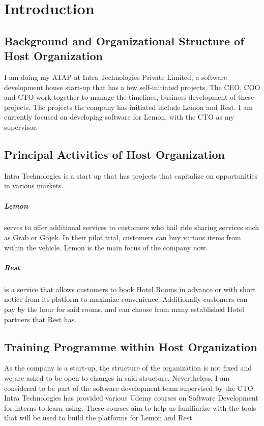 \section{Introduction}
\subsection{Background and Organizational Structure of Host Organization}
\noindent
I am doing my ATAP at Intra Technologies Private Limited, a software development house start-up that has a few self-initiated projects.
The CEO, COO and CTO work together to manage the timelines, business development of these projects.
The projects the company has initiated include Lemon and Rest. I am currently focused on developing software for Lemon, with the CTO as my supervisor. 

\subsection{Principal Activities of Host Organization}
\noindent
Intra Technologies is a start up that has projects that capitalize on opportunities in various markets.

\subparagraph{Lemon}
serves to offer additional services to customers who hail ride sharing services such as Grab or Gojek. In their
pilot trial, customers can buy various items from within the vehicle. Lemon is the main focus of the company now.

\subparagraph{Rest}
is a service that allows customers to book Hotel Rooms in advance or with short notice from its platform to 
maximize convenience. Additionally customers can pay by the hour for said rooms, and can choose from 
many established Hotel partners that Rest has.

\subsection{Training Programme within Host Organization}
\noindent
As the company is a start-up, the structure of the organization is not fixed and we are asked to be open to changes in said structure. 
Nevertheless, I am considered to be part of the software development team supervised by the CTO.
Intra Technologies has provided various Udemy courses\cite{REF1:1} on Software Development for interns to learn using.
These courses aim to help us familiarize with
the tools that will be used to build the platforms for Lemon and Rest.
